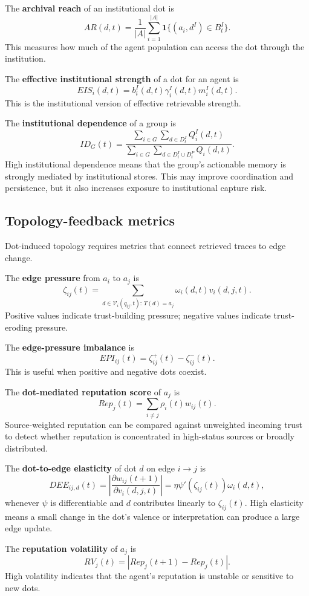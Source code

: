 \documentclass[11pt]{article}
\theoremstyle{remark}
\begin{document}
The \textbf{archival reach} of an institutional dot is
$$
AR(d,t)=\frac{1}{|A|}\sum_{i=1}^{|A|}\mathbf 1\{(a_i,d^I)\in B_t^I\}.
$$
This measures how much of the agent population can access the dot
through the institution.

The \textbf{effective institutional strength} of a dot for an agent is
$$
EIS_i(d,t)=b_i^I(d,t)\gamma_i^I(d,t)m_i^I(d,t).
$$
This is the institutional version of effective retrievable strength.

The \textbf{institutional dependence} of a group is
$$
ID_G(t)=
\frac{\sum_{i\in G}\sum_{d\in D_t^I}Q_i^I(d,t)}
{\sum_{i\in G}\sum_{d\in D_t^I\cup D_t^P}Q_i(d,t)}.
$$
High institutional dependence means that the group's actionable memory
is strongly mediated by institutional stores. This may improve
coordination and persistence, but it also increases exposure to
institutional capture risk.

\subsection{Topology-feedback metrics}\label{topology-feedback-metrics}

Dot-induced topology requires metrics that connect retrieved traces to
edge change.

The \textbf{edge pressure} from $a_i$ to $a_j$ is
$$
\zeta_{ij}(t)=
\sum_{d\in \mathcal V_i(q_{ij},t):\,T(d)=a_j}
\omega_i(d,t)v_i(d,j,t).
$$
Positive values indicate trust-building pressure; negative values
indicate trust-eroding pressure.

The \textbf{edge-pressure imbalance} is
$$
EPI_{ij}(t)=\zeta_{ij}^{+}(t)-\zeta_{ij}^{-}(t).
$$
This is useful when positive and negative dots coexist.

The \textbf{dot-mediated reputation score} of $a_j$ is
$$
Rep_j(t)=\sum_{i\neq j}\rho_i(t)w_{ij}(t).
$$
Source-weighted reputation can be compared against unweighted incoming
trust to detect whether reputation is concentrated in high-status
sources or broadly distributed.

The \textbf{dot-to-edge elasticity} of dot $d$ on edge $i\to j$ is
$$
DEE_{ij,d}(t)=
\left|\frac{\partial w_{ij}(t+1)}{\partial v_i(d,j,t)}\right|
=\eta\psi'(\zeta_{ij}(t))\omega_i(d,t),
$$
whenever $\psi$ is differentiable and $d$ contributes linearly to
$\zeta_{ij}(t)$. High elasticity means a small change in the dot's valence or
interpretation can produce a large edge update.

The \textbf{reputation volatility} of $a_j$ is
$$
RV_j(t)=|Rep_j(t+1)-Rep_j(t)|.
$$
High volatility indicates that the agent's reputation is unstable or
sensitive to new dots.
\end{document}
